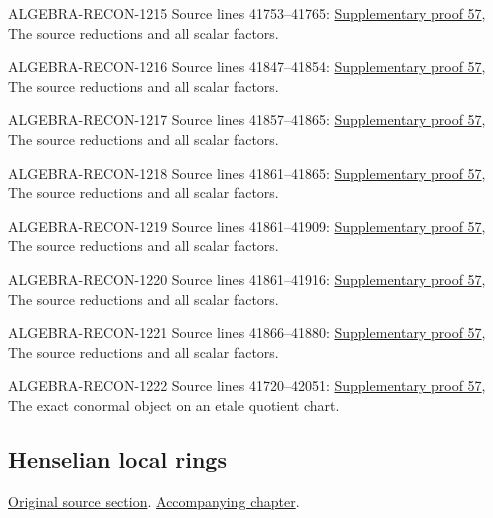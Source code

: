 \begin{AlgebraSourceRoutes}
\item[ALGEBRA-RECON-1215] Source lines 41753--41765: \hyperlink{algebra_local_unramified_notes_20260929}{Supplementary proof 57}, The source reductions and all scalar factors.
\item[ALGEBRA-RECON-1216] Source lines 41847--41854: \hyperlink{algebra_local_unramified_notes_20260929}{Supplementary proof 57}, The source reductions and all scalar factors.
\item[ALGEBRA-RECON-1217] Source lines 41857--41865: \hyperlink{algebra_local_unramified_notes_20260929}{Supplementary proof 57}, The source reductions and all scalar factors.
\item[ALGEBRA-RECON-1218] Source lines 41861--41865: \hyperlink{algebra_local_unramified_notes_20260929}{Supplementary proof 57}, The source reductions and all scalar factors.
\item[ALGEBRA-RECON-1219] Source lines 41861--41909: \hyperlink{algebra_local_unramified_notes_20260929}{Supplementary proof 57}, The source reductions and all scalar factors.
\item[ALGEBRA-RECON-1220] Source lines 41861--41916: \hyperlink{algebra_local_unramified_notes_20260929}{Supplementary proof 57}, The source reductions and all scalar factors.
\item[ALGEBRA-RECON-1221] Source lines 41866--41880: \hyperlink{algebra_local_unramified_notes_20260929}{Supplementary proof 57}, The source reductions and all scalar factors.
\item[ALGEBRA-RECON-1222] Source lines 41720--42051: \hyperlink{algebra_local_unramified_notes_20260929}{Supplementary proof 57}, The exact conormal object on an etale quotient chart.
\end{AlgebraSourceRoutes}

\subsection{Henselian local rings}
\hypertarget{algebra-source-section-henselian}{}
\noindent\href{https://github.com/stacks/stacks-project/blob/a04446e57ec1fbc252a871afcec7752fb2807b14/algebra.tex\#L42062}{Original source section}. \href{algebra.pdf\#nameddest=section-henselian}{Accompanying chapter}.

